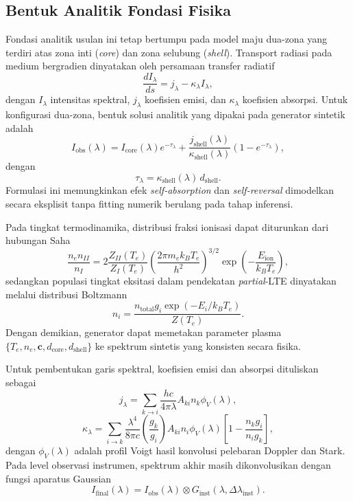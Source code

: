 \subsection{Bentuk Analitik Fondasi Fisika}
Fondasi analitik usulan ini tetap bertumpu pada model maju dua-zona yang terdiri atas zona inti (\textit{core}) dan zona selubung (\textit{shell}). Transport radiasi pada medium bergradien dinyatakan oleh persamaan transfer radiatif
\begin{equation}
\frac{dI_\lambda}{ds} = j_\lambda - \kappa_\lambda I_\lambda ,
\end{equation}
dengan $I_\lambda$ intensitas spektral, $j_\lambda$ koefisien emisi, dan $\kappa_\lambda$ koefisien absorpsi. Untuk konfigurasi dua-zona, bentuk solusi analitik yang dipakai pada generator sintetik adalah
\begin{equation}
I_{\mathrm{obs}}(\lambda)
= I_{\mathrm{core}}(\lambda)e^{-\tau_\lambda}
+ \frac{j_{\mathrm{shell}}(\lambda)}{\kappa_{\mathrm{shell}}(\lambda)}
\left(1-e^{-\tau_\lambda}\right),
\end{equation}
dengan
\begin{equation}
\tau_\lambda = \kappa_{\mathrm{shell}}(\lambda)\, d_{\mathrm{shell}} .
\end{equation}
Formulasi ini memungkinkan efek \textit{self-absorption} dan \textit{self-reversal} dimodelkan secara eksplisit tanpa fitting numerik berulang pada tahap inferensi.

Pada tingkat termodinamika, distribusi fraksi ionisasi dapat diturunkan dari hubungan Saha
\begin{equation}
\frac{n_e n_{II}}{n_I}
=
2\frac{Z_{II}(T_e)}{Z_I(T_e)}
\left(\frac{2\pi m_e k_B T_e}{h^2}\right)^{3/2}
\exp\left(-\frac{E_{\mathrm{ion}}}{k_B T_e}\right),
\end{equation}
sedangkan populasi tingkat eksitasi dalam pendekatan \textit{partial}-LTE dinyatakan melalui distribusi Boltzmann
\begin{equation}
n_i = \frac{n_{\mathrm{total}} g_i \exp(-E_i/k_B T_e)}{Z(T_e)}.
\end{equation}
Dengan demikian, generator dapat memetakan parameter plasma $\{T_e, n_e, \mathbf{c}, d_{\mathrm{core}}, d_{\mathrm{shell}}\}$ ke spektrum sintetis yang konsisten secara fisika.

Untuk pembentukan garis spektral, koefisien emisi dan absorpsi dituliskan sebagai
\begin{equation}
j_\lambda = \sum_{k\rightarrow i}\frac{hc}{4\pi\lambda}A_{ki}n_k\phi_V(\lambda),
\end{equation}
\begin{equation}
\kappa_\lambda =
\sum_{i\rightarrow k}
\frac{\lambda^4}{8\pi c}
\left(\frac{g_k}{g_i}\right)
A_{ki} n_i \phi_V(\lambda)
\left[1-\frac{n_k g_i}{n_i g_k}\right],
\end{equation}
dengan $\phi_V(\lambda)$ adalah profil Voigt hasil konvolusi pelebaran Doppler dan Stark. Pada level observasi instrumen, spektrum akhir masih dikonvolusikan dengan fungsi aparatus Gaussian
\begin{equation}
I_{\mathrm{final}}(\lambda)=I_{\mathrm{obs}}(\lambda)\otimes G_{\mathrm{inst}}(\lambda,\Delta\lambda_{\mathrm{inst}}).
\end{equation}

